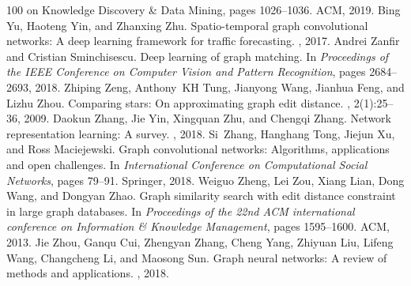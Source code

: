 \begin{thebibliography}{100}
{  on Knowledge Discovery \& Data Mining}, pages 1026--1036. ACM, 2019.
Bing Yu, Haoteng Yin, and Zhanxing Zhu.
\newblock Spatio-temporal graph convolutional networks: A deep learning
  framework for traffic forecasting.
, 2017.
Andrei Zanfir and Cristian Sminchisescu.
\newblock Deep learning of graph matching.
\newblock In {\em Proceedings of the IEEE Conference on Computer Vision and
  Pattern Recognition}, pages 2684--2693, 2018.
Zhiping Zeng, Anthony~KH Tung, Jianyong Wang, Jianhua Feng, and Lizhu Zhou.
\newblock Comparing stars: On approximating graph edit distance.
, 2(1):25--36, 2009.
Daokun Zhang, Jie Yin, Xingquan Zhu, and Chengqi Zhang.
\newblock Network representation learning: A survey.
, 2018.
Si~Zhang, Hanghang Tong, Jiejun Xu, and Ross Maciejewski.
\newblock Graph convolutional networks: Algorithms, applications and open
  challenges.
\newblock In {\em International Conference on Computational Social Networks},
  pages 79--91. Springer, 2018.
Weiguo Zheng, Lei Zou, Xiang Lian, Dong Wang, and Dongyan Zhao.
\newblock Graph similarity search with edit distance constraint in large graph
  databases.
\newblock In {\em Proceedings of the 22nd ACM international conference on
  Information \& Knowledge Management}, pages 1595--1600. ACM, 2013.
Jie Zhou, Ganqu Cui, Zhengyan Zhang, Cheng Yang, Zhiyuan Liu, Lifeng Wang,
  Changcheng Li, and Maosong Sun.
\newblock Graph neural networks: A review of methods and applications.
, 2018.
\end{thebibliography}
